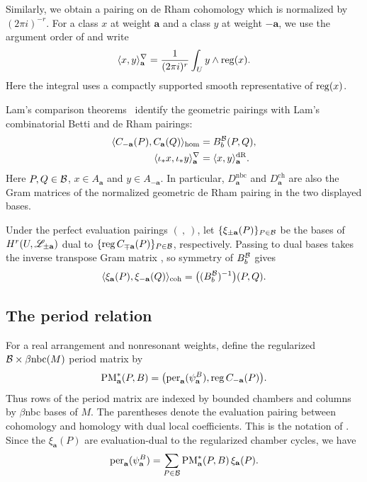 Similarly, we obtain a pairing on de Rham cohomology which is normalized by $(2\pi i)^{-r}$. For a class
$x$ at weight $\mathbf a$ and a class $y$ at weight $-\mathbf a$,
we use the argument order of \cite[equation (15.1)]{Lam} and write
\[
 \langle x,y\rangle^{\nabla}_{\mathbf a}
 =\frac{1}{(2\pi i)^r}\int_U y\wedge\operatorname{reg}(x).
\]
Here the integral uses a compactly supported smooth representative
of $\operatorname{reg}(x)$.

Lam's comparison theorems~\cite[Theorems 12.9 and 12.12]{Lam} identify the geometric pairings with Lam's combinatorial
Betti and de Rham pairings:
\begin{align*}
 \langle C_{-\mathbf a}(P),C_{\mathbf a}(Q)\rangle_{\mathrm{hom}}
   &=B_b^{\mathcal B}(P,Q),\\
 \langle\iota_*x,\iota_*y\rangle^{\nabla}_{\mathbf a}
   &=\langle x,y\rangle^{\mathrm{dR}}_{\mathbf a}.
\end{align*}
Here $P,Q\in\mathcal B$, $x\in A_{\mathbf a}$ and $y\in A_{-\mathbf a}$.
 In particular,
$D_{\mathbf a}^{\mathrm{nbc}}$ and $D_{\mathbf a}^{\mathrm{ch}}$ are also the Gram
matrices of the normalized geometric de Rham pairing in the two
displayed bases.

Under the perfect evaluation pairings $(~,~)$, let
$\{\xi_{\pm\mathbf a}(P)\}_{P\in\mathcal B}$ be the bases of
$H^r(U,\mathscr L_{\pm\mathbf a})$ dual to
$\{\operatorname{reg} C_{\mp\mathbf a}(P)\}_{P\in\mathcal B}$, respectively.
Passing to dual bases takes the inverse transpose Gram
matrix \cite[Section 12.4]{Lam}, so symmetry of $B_b^{\mathcal B}$ gives
\begin{equation}\label{eq:dual-Gram}
 \langle\xi_{\mathbf a}(P),\xi_{-\mathbf a}(Q)\rangle_{\mathrm{coh}}
 =\bigl((B_b^{\mathcal B})^{-1}\bigr)(P,Q).
\end{equation}

\subsection{The period relation}\label{subsec:period}
For a real arrangement and nonresonant weights, define the regularized
$\mathcal B\times\beta\mathrm{nbc}(M)$ period matrix by
\[
 \mathrm{PM}^*_{\mathbf a}(P,B)
 =\bigl(\operatorname{per}_{\mathbf a}(\psi_{\mathbf a}^B),\operatorname{reg} C_{-\mathbf a}(P)\bigr).
\]
Thus rows of the period matrix are indexed by bounded chambers and columns by $\beta$nbc bases of $M$.
The parentheses denote the evaluation pairing between cohomology
and homology with dual local coefficients. This is the notation of
\cite[Definition 3.3.2]{DouaiTerao1997}.
Since the $\xi_{\mathbf a}(P)$ are evaluation-dual to the regularized
chamber cycles, we have
\begin{equation}\label{eq:period-coordinates}
 \operatorname{per}_{\mathbf a}(\psi_{\mathbf a}^B)
 =\sum_{P\in\mathcal B}\mathrm{PM}^*_{\mathbf a}(P,B)\,\xi_{\mathbf a}(P).
\end{equation}


